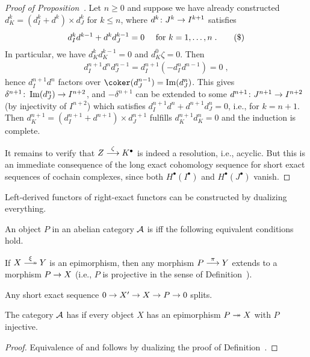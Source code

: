 \documentclass[a4paper,parskip=half,numbers=enddot, DIV=12]{scrreprt}
\begin{document}
\begin{proof}[Proof of Proposition~]
	 Let $n\geq 0$ and suppose we have already constructed $d_{K }^k=(d_{I }^k+d^k)\times d_{J }^k$ for $k\leq n$, where $d^k\colon J^k\morphism I^{k+1}$ satisfies
	 \begin{align}\lbl{eq:Horseshoe3}
	 	 d_{I }^kd^{k-1}+d^kd_{J }^{k-1}=0\quad\text{ for }k=1,\ldots,n\;.\tag{\$}
	 \end{align}
	  In particular, we have $d_{K }^kd_{K }^{k-1}=0$ and $d_{K }^0\zeta=0$. Then
	 \begin{align*}
	 	d_{I }^{n+1}d^nd_{J }^{n-1}=d_{I }^{n+1}\left(-d_{I }^nd^{n-1}\right)=0\;,
	 \end{align*}
	 hence $d_{I }^{n+1}d^n$ factors over $\coker(d_{J }^{n-1})=\Im(d_{J }^n)$. This gives $\delta^{n+1}\colon \Im(d_{J }^n)\morphism I^{n+2}$, and $-\delta^{n+1}$ can be extended to some $d^{n+1}\colon J^{n+1}\morphism I^{n+2}$ (by injectivity of $I^{n+2}$) which satisfies $d_{I }^{n+1}d^{n}+d^{n+1}d_{J }^n=0$, i.e.,  for $k=n+1$. Then $d_{K }^{n+1}=(d_{I }^{n+1}+d^{n+1})\times d_{J }^{n+1}$ fulfills $d_{K }^{n+1}d_{K }^n=0$ and the induction is complete.
	
	 It remains to verify that $Z\morphism[\zeta]K^\bullet $ is indeed a resolution, i.e., acyclic. But this is an immediate consequence of the long exact cohomology sequence for short exact sequences of cochain complexes, since both $H^\bullet (I^\bullet )$ and $H^\bullet (J^\bullet )$ vanish.
\end{proof}
Left-derived functors of right-exact functors can be constructed by dualizing everything.
\begin{defi}
	An object $P$ in an abelian category $\mathcal{A}$ is  iff the following equivalent conditions hold.
	\begin{alphanumerate}
		\item If $X\epimorphism[\xi] Y$ is an epimorphism, then any morphism $P\morphism[\pi] Y$ extends to a morphism $P\morphism X$ (i.e., $P$ is projective in the sense of Definition~).
		\item Any short exact sequence $0\morphism X'\morphism X\morphism P\morphism 0$ splits.
	\end{alphanumerate}
	The category $\mathcal{A}$ has  if every object $X$ has an epimorphism $P\epimorphism X$ with $P$ injective.
\end{defi}
\begin{proof}
	Equivalence of  and  follows by dualizing the proof of Definition~.
\end{proof}
\end{document}
